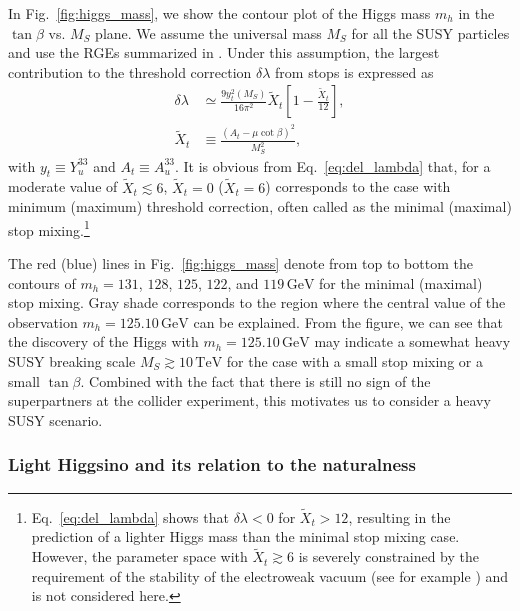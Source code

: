 \documentclass[12pt,twoside,book]{article}
\begin{document}
In Fig.~\ref{fig:higgs_mass}, we show the contour plot of the Higgs mass $m_h$ in the $\tan\beta$ vs. $M_S$ plane.
We assume the universal mass $M_S$ for all the SUSY particles and use the RGEs summarized in \cite{Buttazzo:2013uya}.
Under this assumption, the largest contribution to the threshold correction $\delta \lambda$ from stops is expressed as
\begin{align}
  \delta \lambda &\simeq \frac{9 y_t^2 (M_S)}{16 \pi^2} \tilde{X}_t \left[ 1-\frac{\tilde{X}_t}{12} \right], \label{eq:del_lambda}\\
  \tilde{X}_t &\equiv \frac{(A_t - \mu \cot \beta)^2}{M_S^2},
\end{align}
with $y_t \equiv Y_u^{33}$ and $A_t \equiv A_u^{33}$.
It is obvious from Eq.~\eqref{eq:del_lambda} that, for a moderate value of $\tilde{X}_t \lesssim 6$, $\tilde{X}_t = 0$ ($\tilde{X}_t = 6$) corresponds to the case with minimum (maximum) threshold correction, often called as the minimal (maximal) stop mixing.\footnote
{
  Eq.~\eqref{eq:del_lambda} shows that $\delta \lambda < 0$ for $\tilde{X}_t > 12$, resulting in the prediction of a lighter Higgs mass than the minimal stop mixing case.
  However, the parameter space with $\tilde{X}_t \gtrsim 6$ is severely constrained by the requirement of the stability of the electroweak vacuum (see for example \cite{Bagnaschi:2014rsa}) and is not considered here.
}

The red (blue) lines in Fig.~\ref{fig:higgs_mass} denote from top to bottom the contours of $m_h = 131$, $128$, $125$, $122$, and $119\, \mathrm{GeV}$ for the minimal (maximal) stop mixing.
Gray shade corresponds to the region where the central value of the observation $m_h = 125.10\,\mathrm{GeV}$ can be explained.
From the figure, we can see that the discovery of the Higgs with $m_h = 125.10\,\mathrm{GeV}$ may indicate a somewhat heavy SUSY breaking scale $M_S \gtrsim 10\,\mathrm{TeV}$ for the case with a small stop mixing or a small $\tan \beta$.
Combined with the fact that there is still no sign of the superpartners at the collider experiment, this motivates us to consider a heavy SUSY scenario.


\subsubsection*{Light Higgsino and its relation to the naturalness}
\end{document}
